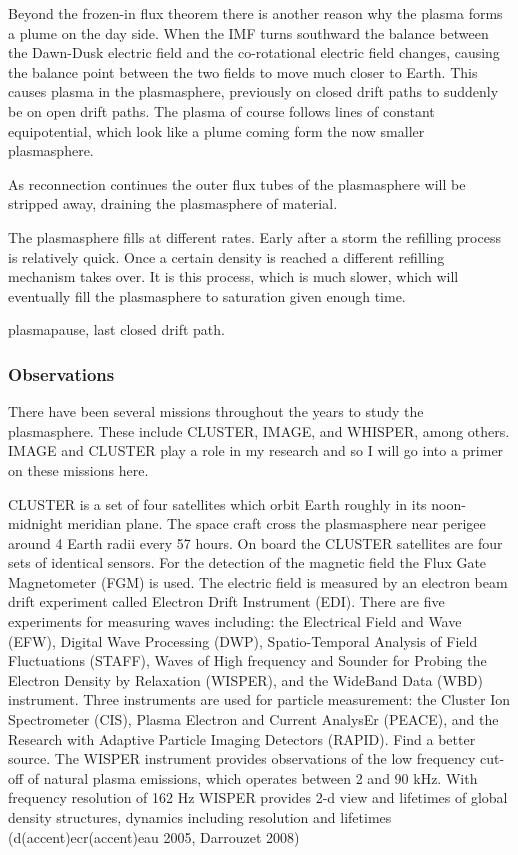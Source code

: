 \documentclass[utf8]{report}
\begin{document}
 Beyond the frozen-in flux theorem there is another reason why the plasma forms a plume on the day side. When the IMF turns southward the balance between the Dawn-Dusk electric field and the co-rotational electric field changes, causing the balance point between the two fields to move much closer to Earth. This causes plasma in the plasmasphere, previously on closed drift paths to suddenly be on open drift paths. The plasma of course follows lines of constant equipotential, which look like a plume coming form the now smaller plasmasphere. 
 
 As reconnection continues the outer flux tubes of the plasmasphere will be stripped away, draining the plasmasphere of material.
 
The plasmasphere fills at different rates. Early after a storm the refilling process is relatively quick. Once a certain density is reached a different refilling mechanism takes over. It is this process, which is much slower, which will eventually fill the plasmasphere to saturation given enough time. 
 
 plasmapause, last closed drift path. 
 
 \subsubsection{Observations}
 
 There have been several missions throughout the years to study the plasmasphere. These  include CLUSTER, IMAGE, and WHISPER, among others. IMAGE and CLUSTER play a role in my research and so I will go into a primer on these missions here. 
 
 CLUSTER is a set of four satellites which orbit Earth roughly in its noon-midnight meridian plane. The space craft cross the plasmasphere near perigee around 4 Earth radii every 57 hours. On board the CLUSTER satellites are four sets of identical sensors. For the detection of the magnetic field the Flux Gate Magnetometer (FGM) is used. The electric field is measured by an electron beam drift experiment called Electron Drift Instrument (EDI). There are five experiments for measuring waves including: the Electrical Field and Wave (EFW), Digital Wave Processing (DWP), Spatio-Temporal Analysis of Field Fluctuations (STAFF), Waves of High frequency and Sounder for Probing the Electron Density by Relaxation (WISPER), and the WideBand Data (WBD) instrument. Three instruments are used for particle measurement: the Cluster Ion Spectrometer (CIS), Plasma Electron and Current AnalysEr (PEACE), and the Research with Adaptive Particle Imaging Detectors (RAPID). \color{red} Find a better source. \color{black}
 The WISPER instrument provides observations of the low frequency cut-off of natural plasma emissions, which operates between 2 and 90 kHz. With frequency resolution of 162 Hz WISPER provides 2-d view and lifetimes of global density structures, dynamics including resolution and lifetimes (d(accent)ecr(accent)eau 2005, Darrouzet 2008)
 
\end{document}
